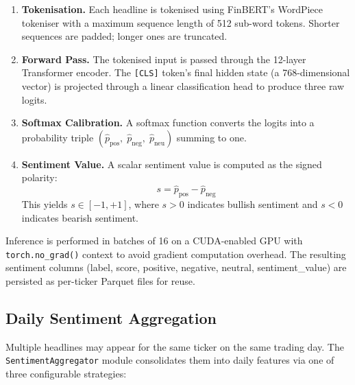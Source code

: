 \begin{enumerate}
  \item \textbf{Tokenisation.}  Each headline is tokenised using FinBERT's
        WordPiece tokeniser with a maximum sequence length of 512 sub-word
        tokens.  Shorter sequences are padded; longer ones are truncated.

  \item \textbf{Forward Pass.}  The tokenised input is passed through the
        12-layer Transformer encoder.  The \texttt{[CLS]} token's final hidden
        state (a 768-dimensional vector) is projected through a linear
        classification head to produce three raw logits.

  \item \textbf{Softmax Calibration.}  A softmax function converts the logits
        into a probability triple
        $(\hat{p}_{\text{pos}},\;\hat{p}_{\text{neg}},\;\hat{p}_{\text{neu}})$
        summing to one.

  \item \textbf{Sentiment Value.}  A scalar sentiment value is computed as the
        signed polarity:
        \begin{equation}
          s = \hat{p}_{\text{pos}} - \hat{p}_{\text{neg}}
          \label{eq:sentiment-value}
        \end{equation}
        This yields $s \in [-1, +1]$, where $s > 0$ indicates bullish sentiment
        and $s < 0$ indicates bearish sentiment.
\end{enumerate}

\noindent
Inference is performed in batches of 16 on a CUDA-enabled GPU with
\texttt{torch.no\_grad()} context to avoid gradient computation overhead.  The
resulting sentiment columns (label, score, positive, negative, neutral,
sentiment\_value) are persisted as per-ticker Parquet files for reuse.

\subsection{Daily Sentiment Aggregation}
\label{sec:aggregation}

Multiple headlines may appear for the same ticker on the same trading day.  The
\texttt{SentimentAggregator} module consolidates them into daily features via
one of three configurable strategies:

